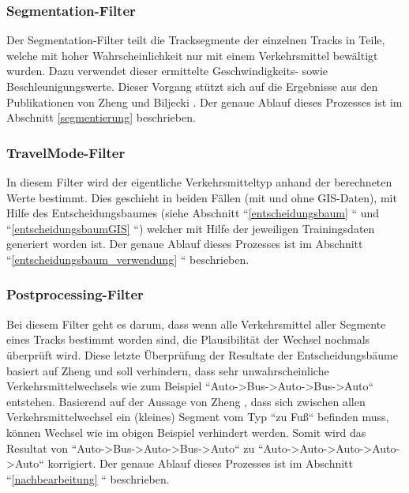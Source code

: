 
\subsubsection{Segmentation-Filter}
Der Segmentation-Filter teilt die Tracksegmente der einzelnen Tracks in Teile, welche mit hoher Wahrscheinlichkeit nur mit einem Verkehrsmittel bewältigt wurden. Dazu verwendet dieser ermittelte Geschwindigkeits- sowie Beschleunigungswerte. Dieser Vorgang stützt sich auf die Ergebnisse aus den Publikationen von Zheng \cite{zheng_understanding_2010} und Biljecki \cite{biljecki_transportation_2013}. Der genaue Ablauf dieses Prozesses ist im Abschnitt \ref{segmentierung}  beschrieben.

\subsubsection{TravelMode-Filter}
In diesem Filter wird der eigentliche Verkehrsmitteltyp anhand der berechneten Werte bestimmt. Dies geschieht in beiden Fällen (mit und ohne GIS-Daten), mit Hilfe des Entscheidungsbaumes (siehe Abschnitt ``\ref{entscheidungsbaum} `` und  ``\ref{entscheidungsbaumGIS} ``) welcher mit Hilfe der jeweiligen Trainingsdaten generiert worden ist. Der genaue Ablauf dieses Prozesses ist im Abschnitt ``\ref{entscheidungsbaum_verwendung} `` beschrieben.

\subsubsection{Postprocessing-Filter}
Bei diesem Filter geht es darum, dass wenn alle Verkehrsmittel aller Segmente eines Tracks bestimmt worden sind, die Plausibilität der Wechsel nochmals überprüft wird. Diese letzte Überprüfung der Resultate der Entscheidungsbäume basiert auf Zheng \cite{zheng_understanding_2010} und soll verhindern, dass sehr unwahrscheinliche Verkehrsmittelwechsels wie zum Beispiel ``Auto->Bus->Auto->Bus->Auto`` entstehen. Basierend auf der Aussage von Zheng \cite{zheng_understanding_2010}, dass sich zwischen allen Verkehrsmittelwechsel ein (kleines) Segment vom Typ ``zu Fuß`` befinden muss, können Wechsel wie im obigen Beispiel verhindert werden. Somit wird das Resultat von ``Auto->Bus->Auto->Bus->Auto`` zu ``Auto->Auto->Auto->Auto->Auto`` korrigiert. Der genaue Ablauf dieses Prozesses ist im Abschnitt ``\ref{nachbearbeitung} `` beschrieben.


